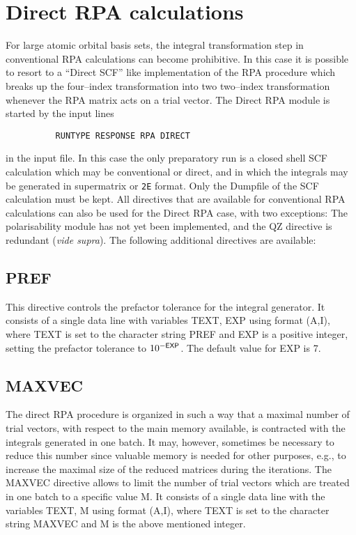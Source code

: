 \documentclass[11pt,fleqn]{article}
\begin{document}
\section{Direct RPA calculations}

For large atomic orbital basis sets, the integral transformation step
in conventional RPA calculations can become prohibitive. In this case
it is possible to resort to a ``Direct SCF'' like implementation of the
RPA procedure which breaks up the four--index transformation into
two two--index transformation whenever the RPA matrix acts on a trial
vector. The Direct RPA module is started by the input lines

{
\footnotesize
\begin{verbatim}
          RUNTYPE RESPONSE RPA DIRECT
\end{verbatim}
}
in the input file. In this case the only preparatory run is a 
closed shell SCF calculation which may be conventional or direct,
and in which the integrals may be generated in supermatrix or {\tt 2E}
format. Only the Dumpfile of the SCF calculation must be kept.
All directives that are available for conventional RPA calculations
can also be used for the Direct RPA case, with two exceptions:
The polarisability module has not yet been implemented, and the 
QZ directive is redundant ({\em vide supra}).
The following additional directives are available:
%
\subsection{PREF}
This directive controls the prefactor tolerance for the integral
generator. It consists of a single data line with variables
TEXT, EXP using format (A,I), where TEXT is set to the character string
PREF and EXP is a positive integer, setting the prefactor tolerance
to $10^{-\mbox{\scriptsize\sf EXP}}$. The default value for EXP is 7.
%
\subsection{MAXVEC}
The direct RPA procedure is organized in such a way that a maximal number
of trial vectors, with respect to the main memory available,
is contracted with the integrals generated in one batch.
It may, however, sometimes be necessary to reduce this number since
valuable memory is needed for other purposes, e.g., to increase the
maximal size of the reduced matrices during the iterations. The
MAXVEC directive allows to limit the number of trial vectors which are
treated in one batch to a specific value M.
It consists of a single data line
with the variables TEXT, M using format (A,I), 
where TEXT is set to the character string
MAXVEC and M is the above mentioned integer.
%
\end{document}
